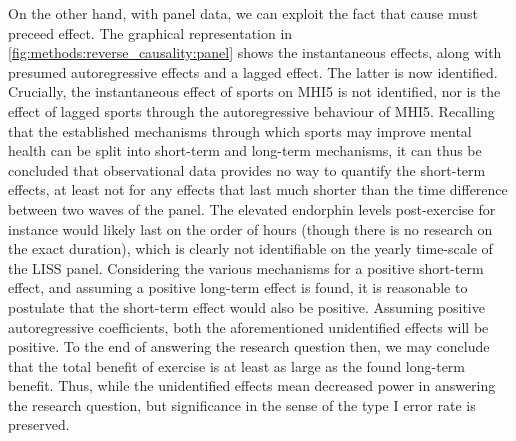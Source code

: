 On the other hand, with panel data, we can exploit the fact that cause must preceed effect. The graphical representation
in \cref{fig:methods:reverse_causality:panel} shows the instantaneous effects, along with presumed
autoregressive effects and a lagged effect.
The latter is now identified. Crucially, the instantaneous effect of sports on MHI5 is not identified, nor is the effect
of lagged sports through the autoregressive behaviour of MHI5.
Recalling that the established mechanisms through which sports may improve mental health can be split into short-term
and long-term mechanisms, it can thus be concluded that observational data provides no way to quantify the short-term effects,
at least not for any effects that last much shorter than the time difference between two waves of the panel.
The elevated endorphin levels post-exercise for instance would likely last on the order of hours (though there is no
research on the exact duration), which is clearly not identifiable on the yearly time-scale of the LISS panel.
Considering the various mechanisms for a positive short-term effect, and assuming a positive long-term effect is found,
it is reasonable to postulate that the short-term effect would also be positive.
Assuming positive autoregressive coefficients, both the aforementioned unidentified effects will be positive.
To the end of answering the research question then, we may conclude that the total benefit of exercise is at least
as large as the found long-term benefit. Thus, while the unidentified effects mean decreased power in answering
the research question, but significance in the sense of the type I error rate is preserved.

